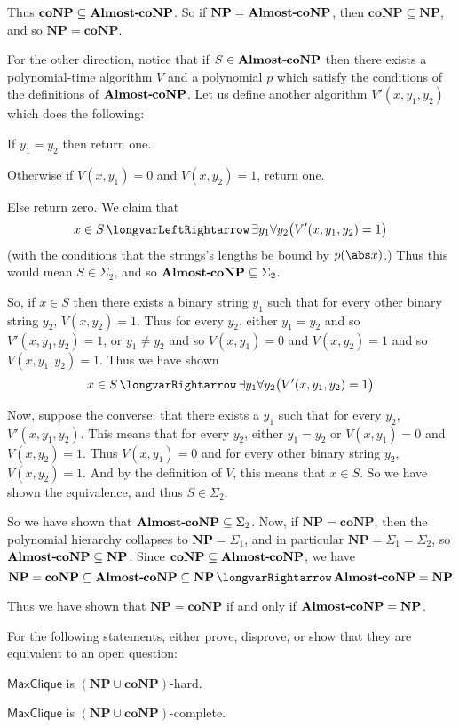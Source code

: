 \documentclass[10pt]{article}
\def\implies{\,\longvarRightarrow\,}
\def\iff{\,\longvarLeftRightarrow\,}
\def\maxclique{\mathsf{MaxClique}}
\def\NP{\mathbf{NP}}
\def\coNP{\mathbf{coNP}}
\begin{document}
Thus $\coNP\subseteq\acoNP$.
So if $\NP=\acoNP$, then $\coNP\subseteq\NP$, and so $\NP=\coNP$.

For the other direction, notice that if $S\in\acoNP$ then there exists a polynomial-time algorithm $V$ and a polynomial $p$ which satisfy the conditions of the definitions of $\acoNP$.
Let us define another algorithm $V'(x,y_1,y_2)$ which does the following:
\benum
    \item If $y_1=y_2$ then return one.
    \item Otherwise if $V(x,y_1)=0$ and $V(x,y_2)=1$, return one.
    \item Else return zero.
\eenum
We claim that
\[ x\in S\iff\exists y_1\forall y_2\bigl(V'(x,y_1,y_2)=1\bigr) \]
(with the conditions that the strings's lengths be bound by $p(\abs x)$.)
Thus this would mean $S\in\Sigma_2$, and so $\acoNP\subseteq\Sigma_2$.

So, if $x\in S$ then there exists a binary string $y_1$ such that for every other binary string $y_2$, $V(x,y_2)=1$.
Thus for every $y_2$, either $y_1=y_2$ and so $V'(x,y_1,y_2)=1$, or $y_1\neq y_2$ and so $V(x,y_1)=0$ and $V(x,y_2)=1$ and so $V(x,y_1,y_2)=1$.
Thus we have shown
\[ x\in S\implies\exists y_1\forall y_2\bigl(V'(x,y_1,y_2)=1\bigr) \]

Now, suppose the converse: that there exists a $y_1$ such that for every $y_2$, $V'(x,y_1,y_2)$.
This means that for every $y_2$, either $y_1=y_2$ or $V(x,y_1)=0$ and $V(x,y_2)=1$.
Thus $V(x,y_1)=0$ and for every other binary string $y_2$, $V(x,y_2)=1$.
And by the definition of $V$, this means that $x\in S$.
So we have shown the equivalence, and thus $S\in\Sigma_2$.

So we have shown that $\acoNP\subseteq\Sigma_2$.
Now, if $\NP=\coNP$, then the polynomial hierarchy collapses to $\NP=\Sigma_1$, and in particular $\NP=\Sigma_1=\Sigma_2$, so $\acoNP\subseteq\NP$.
Since $\coNP\subseteq\acoNP$, we have
\[ \NP=\coNP\subseteq\acoNP\subseteq\NP \implies \acoNP=\NP \]

Thus we have shown that $\NP=\coNP$ if and only if $\acoNP=\NP$.

\begin{exercise*}

    For the following statements, either prove, disprove, or show that they are equivalent to an open question:
    \benum
        \item $\maxclique$ is $(\NP\cup\coNP)$-hard.
        \item $\maxclique$ is $(\NP\cup\coNP)$-complete.
    \eenum

\end{exercise*}
\end{document}
